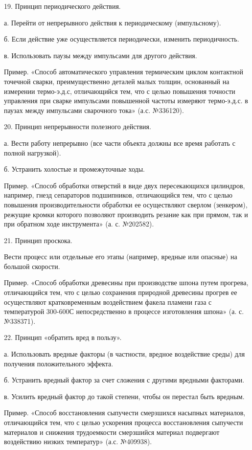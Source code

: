19. Принцип периодического действия.

а. Перейти от непрерывного действия к периодическому (импульсному).

б.   Если   действие   уже   осуществляется   периодически,   изменить
периодичность.

в. Использовать паузы между импульсами для другого действия.

Пример.   «Способ   автоматического  управления   термическим   циклом
контактной  точечной  сварки,  преимущественно деталей  малых  толщин,
основанный  на измерении  термо-э.д.с, отличающийся  тем, что  с целью
повышения точности управления при сварке импульсами повышенной частоты
измеряют термо-э.д.с. в паузах между импульсами сварочного тока» (а.с.
№336120).

20. Принцип непрерывности полезного действия.

а.  Вести  работу  непрерывно  (все части  объекта  должны  все  время
работать с полной нагрузкой).

б. Устранить холостые и промежуточные ходы.

Пример.  «Способ  обработки  отверстий   в  виде  двух  пересекающихся
цилиндров, например, гнезд  сепараторов подшипников, отличающийся тем,
что  с целью  повышения производительности  обработки ее  осуществляют
сверлом  (зенкером),  режущие  кромки которого  позволяют  производить
резание как  при прямом, так и  при обратном ходе инструмента»  (а. с.
№202582).

21. Принцип проскока.

Вести процесс или отдельные его  этапы (например, вредные или опасные)
на большой скорости.

Пример.  «Способ  обработки  древесины при  производстве  шпона  путем
прогрева, отличающийся тем, что с целью сохранения природной древесины
прогрев  ее осуществляют  кратковременным воздействием  факела пламени
газа с температурой 300-600С  непосредственно в процессе изготовления
шпона» (а. с. №338371).

22. Принцип «обратить вред в пользу».

а.  Использовать вредные  факторы  (в  частности, вредное  воздействие
среды) для получения положительного эффекта.

б.  Устранить  вредный фактор  за  счет  сложения с  другими  вредными
факторами.

в. Усилить  вредный фактор  до такой степени,  чтобы он  перестал быть
вредным.

Пример.   «Способ   восстановления   сыпучести   смерзшихся   насыпных
материалов,  отличающийся   тем,  что   с  целью   ускорения  процесса
восстановления сыпучести материалов и снижения трудоемкости смерзшийся
материал подвергают воздействию низких температур» (а.с. №409938).

